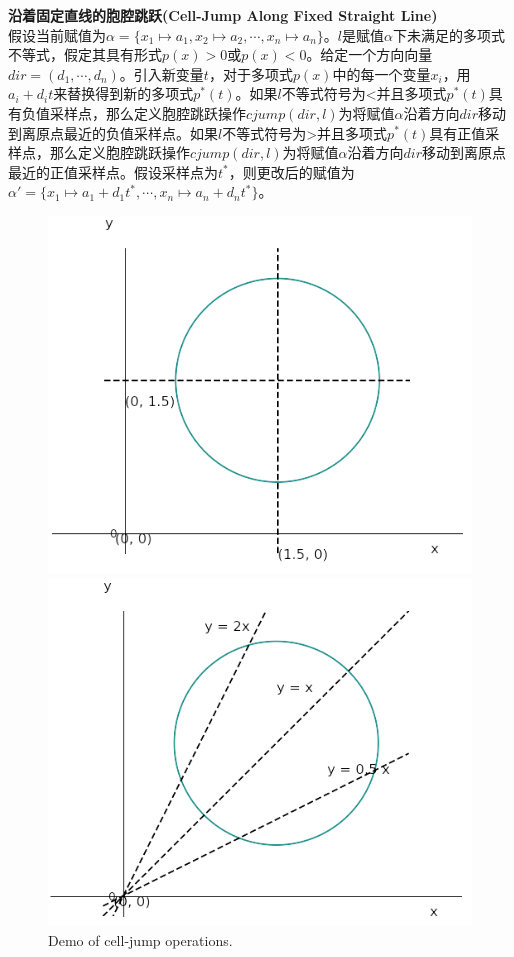\begin{definition}{\textbf{沿着固定直线的胞腔跳跃(Cell-Jump Along Fixed Straight Line)}}\\
    假设当前赋值为$\alpha = \{x_1 \mapsto a_1, x_2 \mapsto a_2, \cdots, x_n \mapsto a_n\}$。$l$是赋值$\alpha$下未满足的多项式不等式，假定其具有形式$p(x) > 0$或$p(x) < 0$。给定一个方向向量$dir = (d_1, \cdots, d_n)$。引入新变量$t$，对于多项式$p(x)$中的每一个变量$x_i$，用$a_i + d_i t$来替换得到新的多项式$p^{*}(t)$。如果$l$不等式符号为<并且多项式$p^{*}(t)$具有负值采样点，那么定义胞腔跳跃操作$cjump(dir, l)$为将赋值$\alpha$沿着方向$dir$移动到离原点最近的负值采样点。如果$l$不等式符号为>并且多项式$p^{*}(t)$具有正值采样点，那么定义胞腔跳跃操作$cjump(dir, l)$为将赋值$\alpha$沿着方向$dir$移动到离原点最近的正值采样点。假设采样点为$t^*$，则更改后的赋值为$\alpha' = \{x_1 \mapsto a_1 + d_1 t^*, \cdots, x_n \mapsto a_n + d_n t^*\}$。
\end{definition}

\begin{figure}[t]
    \centering
    \includegraphics[width=0.45\columnwidth]{Img/jump1.png}\qquad
    \includegraphics[width=0.45\columnwidth]{Img/jump2.png}
     {Demo of cell-jump operations.}
\label{fig:cell-jump}
\end{figure}

